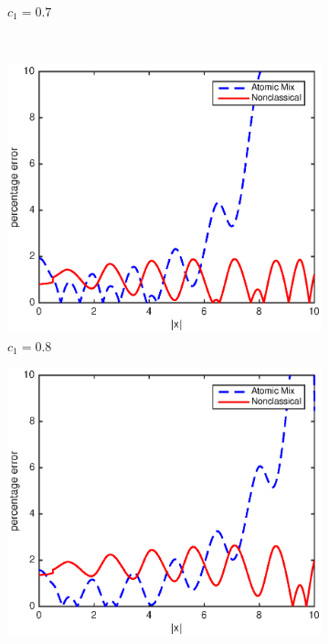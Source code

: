 \documentclass[12pt]{article}
\begin{document}
{\begin{figure}[p]
\begin{subfigure}{0.495\textwidth}
        \caption{$c_1 = 0.7$}
        \label{figerrC70}
    \end{subfigure}
    \\
    \centering
    \begin{subfigure}{0.495\textwidth}
        \centering
        \includegraphics[width=\textwidth]{NSE_err_C80.eps}
        \caption{$c_1 = 0.8$}
        \label{figerrC80}
    \end{subfigure}
    \hfill
    \begin{subfigure}{0.495\textwidth}
        \centering
        \includegraphics[width=\textwidth]{NSE_err_C90.eps}

\end{subfigure}
\end{figure}}
\end{document}
